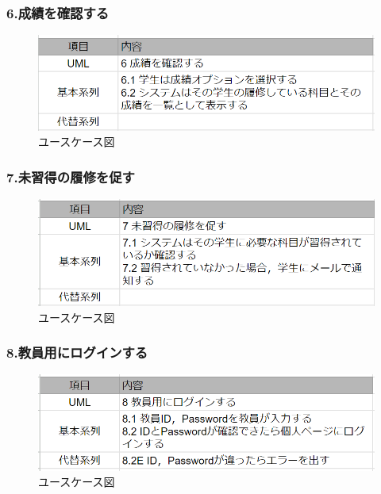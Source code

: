 \documentclass[documentclass]{jsarticle}
\begin{document}
\subsubsection*{6.成績を確認する}
\begin{figure}[H]
  \begin{center}
    \includegraphics*[scale=0.6]{figure/4-6.png}
  \end{center}
  \caption{ユースケース図}
  \label{fig:4-6}
\end{figure}

\subsubsection*{7.未習得の履修を促す}
\begin{figure}[H]
  \begin{center}
    \includegraphics*[scale=0.6]{figure/4-7.png}
  \end{center}
  \caption{ユースケース図}
  \label{fig:4-7}
\end{figure}

\subsubsection*{8.教員用にログインする}
\begin{figure}[H]
  \begin{center}
    \includegraphics*[scale=0.6]{figure/4-8.png}
  \end{center}
  \caption{ユースケース図}
  \label{fig:4-8}
\end{figure}
\end{document}
